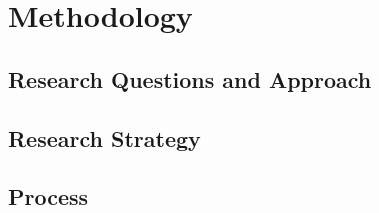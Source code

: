 
\chapter{Methodology}
\label{ch:methodology}


\section{Research Questions and Approach}


\section{Research Strategy}


\section{Process}
